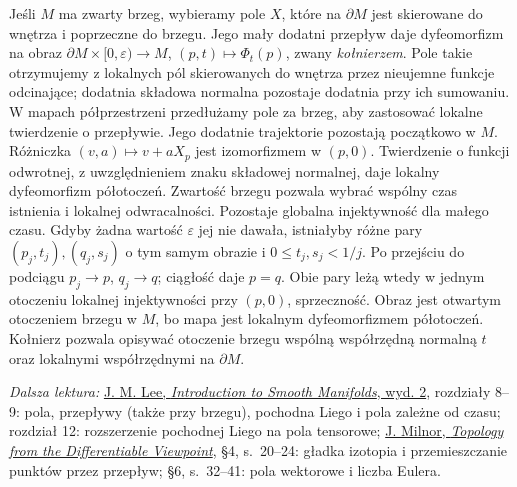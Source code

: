 \begin{uwaga}
Jeśli $M$ ma zwarty brzeg, wybieramy pole $X$, które na
$\partial M$ jest skierowane do wnętrza i poprzeczne do brzegu.
Jego mały dodatni przepływ daje dyfeomorfizm na obraz
$\partial M\times[0,\varepsilon)\to M$,
$(p,t)\mapsto\Phi_t(p)$, zwany \emph{kołnierzem}.
Pole takie otrzymujemy z lokalnych pól skierowanych do wnętrza
przez nieujemne funkcje odcinające; dodatnia składowa normalna
pozostaje dodatnia przy ich sumowaniu. W mapach półprzestrzeni
przedłużamy pole za brzeg, aby zastosować lokalne twierdzenie
o przepływie. Jego dodatnie trajektorie pozostają początkowo w $M$.
Różniczka $(v,a)\mapsto v+aX_p$ jest izomorfizmem w $(p,0)$.
Twierdzenie o funkcji odwrotnej, z uwzględnieniem znaku składowej
normalnej, daje lokalny dyfeomorfizm półotoczeń. Zwartość brzegu
pozwala wybrać wspólny czas istnienia i lokalnej odwracalności.
Pozostaje globalna injektywność dla małego czasu. Gdyby żadna
wartość $\varepsilon$ jej nie dawała, istniałyby różne pary
$(p_j,t_j),(q_j,s_j)$ o tym samym obrazie i $0\le t_j,s_j<1/j$.
Po przejściu do podciągu $p_j\to p$, $q_j\to q$; ciągłość
daje $p=q$. Obie pary leżą wtedy w jednym otoczeniu lokalnej
injektywności przy $(p,0)$, sprzeczność. Obraz jest otwartym
otoczeniem brzegu w $M$, bo mapa jest lokalnym dyfeomorfizmem
półotoczeń. Kołnierz pozwala opisywać otoczenie brzegu
wspólną współrzędną normalną $t$ oraz lokalnymi współrzędnymi
na $\partial M$.
\end{uwaga}

\par\smallskip
{\footnotesize\noindent\emph{Dalsza lektura:}
\href{https://doi.org/10.1007/978-1-4419-9982-5}
{J. M. Lee, \emph{Introduction to Smooth Manifolds}, wyd. 2},
rozdziały 8--9: pola, przepływy (także przy brzegu),
pochodna Liego i pola zależne od czasu;
rozdział 12: rozszerzenie pochodnej Liego na pola tensorowe;
\href{https://people.dm.unipi.it/benedett/MILNOR-TDVPOINT.pdf}
{J. Milnor, \emph{Topology from the Differentiable Viewpoint}},
§4, s.~20--24: gładka izotopia i przemieszczanie punktów
przez przepływ; §6, s.~32--41: pola wektorowe i liczba Eulera.\par}
\clearpage
